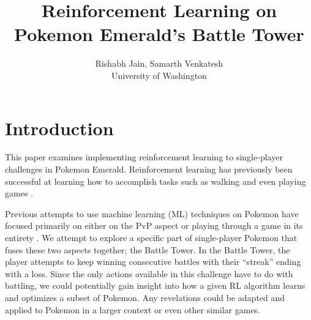 \documentclass[10pt,twocolumn,letterpaper]{article}
\begin{document}
\title{Reinforcement Learning on Pokemon Emerald's Battle Tower}

\author{Rishabh Jain, Samarth Venkatesh \\
University of Washington \\
}
\maketitle


\section{Introduction}
\label{sec:intro}

This paper examines implementing reinforcement learning to single-player challenges in Pokemon Emerald.
Reinforcement learning has previously been successful at learning how to accomplish tasks such as
walking \cite{Haarnoja} and even playing games \cite{Mnih}.

Previous attempts to use machine learning (ML) techniques on Pokemon have focused primarily on either on the PvP aspect \cite{Hu} or
playing through a game in its entirety \cite{Whiddy}. We attempt to explore a specific part
of single-player Pokemon that fuses these two aspects together; the Battle Tower. In the Battle Tower,
the player attempts to keep winning consecutive battles with their ``streak'' ending with a loss.
Since the only actions available in this challenge have to do with battling, we could potentially
gain insight into how a given RL algorithm learns and optimizes a subset of Pokemon.
Any revelations could be adapted and applied to Pokemon in a larger context or even other similar games.
\end{document}
